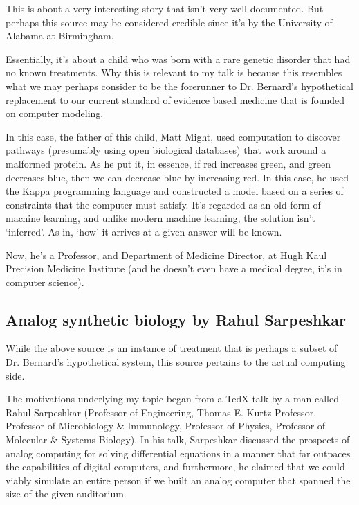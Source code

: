 This is about a very interesting story that isn't very well documented. But perhaps this source may be considered credible since it's by the University of Alabama at Birmingham.

Essentially, it's about a child who was born with a rare genetic disorder that had no known treatments. Why this is relevant to my talk is because this resembles what we may perhaps consider to be the forerunner to Dr. Bernard's hypothetical replacement to our current standard of evidence based medicine that is founded on computer modeling.

In this case, the father of this child, Matt Might, used computation to discover pathways (presumably using open biological databases) that work around a malformed protein. As he put it, in essence, if red increases green, and green decreases blue, then we can decrease blue by increasing red. In this case, he used the Kappa programming language and constructed a model based on a series of constraints that the computer must satisfy. It's regarded as an old form of machine learning, and unlike modern machine learning, the solution isn’t ‘inferred’. As in, ‘how’ it arrives at a given answer will be known.

Now, he’s a Professor, and Department of Medicine Director, at Hugh Kaul Precision Medicine Institute (and he doesn't even have a medical degree, it's in computer science).

\subsection{Analog synthetic biology by Rahul Sarpeshkar}


While the above source is an instance of treatment that is perhaps a subset of Dr. Bernard's hypothetical system, this source pertains to the actual computing side. 

The motivations underlying my topic began from a TedX talk by a man called Rahul Sarpeshkar (Professor of Engineering, Thomas E. Kurtz Professor, Professor of Microbiology \& Immunology, Professor of Physics, Professor of Molecular \& Systems Biology). In his talk, Sarpeshkar discussed the prospects of analog computing for solving differential equations in a manner that far outpaces the capabilities of digital computers, and furthermore, he claimed that we could viably simulate an entire person if we built an analog computer that spanned the size of the given auditorium.

